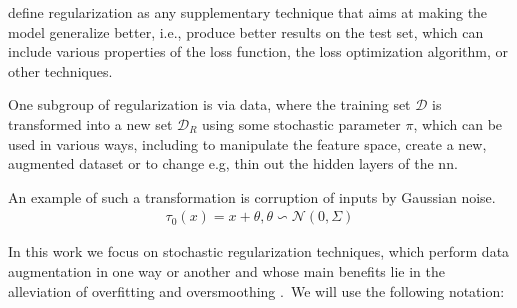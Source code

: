 \citet{Kukacka2017} define regularization as any supplementary technique that aims at making the model generalize better, i.e., produce better results on the test set, which can include various properties of the loss function, the loss optimization algorithm, or other techniques.

One subgroup of regularization is via data, where the training set $\mathcal{D}$ is
transformed into a new set $\mathcal{D}_{R}$ using some stochastic parameter
$\pi$, which can be used in various ways, including to manipulate the feature space,
create a new, augmented dataset or to change e.g, thin out the hidden layers of
the \ac{nn}.

An example of such a transformation is corruption of inputs by Gaussian noise.
\begin{align*}
    \tau_{0}(x) = x + \theta, \theta \backsim \mathcal{N}(0, \Sigma)
\end{align*}

In this work we focus on stochastic regularization techniques, which perform
data augmentation in one way or another and whose main benefits lie in the alleviation
of overfitting and oversmoothing \cite{Hasanzadeh2020}.\
We will use the following notation: \

